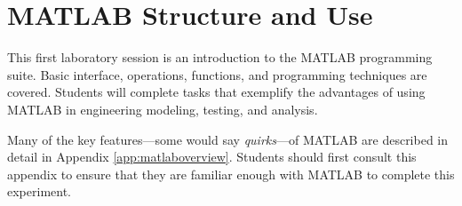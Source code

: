 \chapter{MATLAB Structure and Use}

This first laboratory session is an introduction to the MATLAB programming suite.  Basic interface, operations, functions, and programming techniques are covered.  Students will complete tasks that exemplify the advantages of using MATLAB in engineering modeling, testing, and analysis.
\par
Many of the key features---some would say \textit{quirks}---of MATLAB are described in detail in Appendix \ref{app:matlaboverview}.  Students should first consult this appendix to ensure that they are familiar enough with MATLAB to complete this experiment.